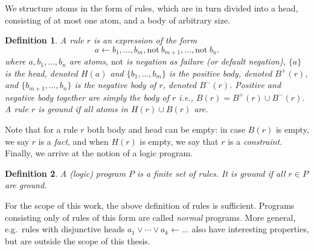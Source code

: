 \documentclass[final]{vutinfth} %
\newcommand{\todo}[1]{{\color{red}\textbf{TODO: {#1}}}} %
\newtheorem{definition}{Definition}[chapter]
\newcommand{\headf}{H}
\newcommand{\bodyf}{B}
\newcommand{\fail}{\mathrm{not } \ \xspace}
\newcommand{\from}{\ensuremath{\leftarrow}}
\begin{document}


We structure atoms in the form of rules, which are in turn divided into a head, consisting of at most one atom, and a body of arbitrary size.

\begin{definition}
A \emph{rule} $r$ is an expression of the form $$a \from b_1, \ldots, b_m, \fail b_{m+1}, \ldots, \fail b_n.$$ where $a, b_1, \ldots, b_n$ are atoms, $\mathrm{not}$ is \emph{negation as failure} (or \emph{default negation}), $\{ a \}$ is the \emph{head}, denoted $\headf(a)$ and $\{ b_1, \ldots, b_m \}$ is the \emph{positive body}, denoted $\bodyf^+(r)$, and $\{ b_{m+1}, \ldots, b_n \}$ is the \emph{negative body} of $r$, denoted $\bodyf^-(r)$. Positive and negative body together are simply the \emph{body} of $r$ i.e., $\bodyf(r) = \bodyf^+(r)\cup \bodyf^-(r)$.
A rule $r$ is \emph{ground} if all atoms in $\headf(r) \cup \bodyf(r)$ are.
\end{definition}

Note that for a rule $r$ both body and head can be empty: in case $\bodyf(r)$ is empty, we say $r$ is a \emph{fact}, and when $\headf(r)$ is empty, we say that $r$ is a \emph{constraint}. Finally, we arrive at the notion of a logic program.

\begin{definition}
A \emph{(logic) program} $P$ is a finite set of rules. It is \emph{ground} if all $r \in P$ are ground.
\end{definition}


For the scope of this work, the above definition of rules is sufficient. Programs consisting only of rules of this form are called \emph{normal} programs. More general, e.g.~rules with disjunctive heads $a_1 \vee \cdots \vee a_k \from \ldots$ also have interesting properties, but are outside the scope of this thesis.
\end{document}
